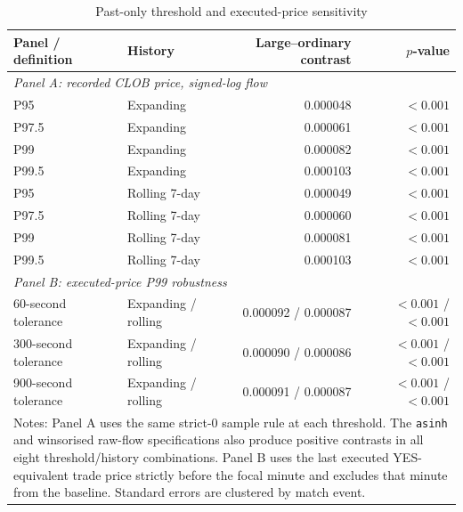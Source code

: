 \begin{table}[htbp]
\centering
\caption{Past-only threshold and executed-price sensitivity}
\label{tab:v6-sensitivity}
\small
\begin{tabular}{llrr}
\toprule
Panel / definition & History & Large--ordinary contrast & $p$-value \\
\midrule
\multicolumn{4}{l}{\textit{Panel A: recorded CLOB price, signed-log flow}} \\
P95   & Expanding & 0.000048 & $<0.001$ \\
P97.5 & Expanding & 0.000061 & $<0.001$ \\
P99   & Expanding & 0.000082 & $<0.001$ \\
P99.5 & Expanding & 0.000103 & $<0.001$ \\
P95   & Rolling 7-day & 0.000049 & $<0.001$ \\
P97.5 & Rolling 7-day & 0.000060 & $<0.001$ \\
P99   & Rolling 7-day & 0.000081 & $<0.001$ \\
P99.5 & Rolling 7-day & 0.000103 & $<0.001$ \\
\midrule
\multicolumn{4}{l}{\textit{Panel B: executed-price P99 robustness}} \\
60-second tolerance  & Expanding / rolling & 0.000092 / 0.000087 & $<0.001$ / $<0.001$ \\
300-second tolerance & Expanding / rolling & 0.000090 / 0.000086 & $<0.001$ / $<0.001$ \\
900-second tolerance & Expanding / rolling & 0.000091 / 0.000087 & $<0.001$ / $<0.001$ \\
\bottomrule
\multicolumn{4}{p{0.92\textwidth}}{\footnotesize Notes: Panel A uses the same strict-0 sample rule at each threshold. The \texttt{asinh} and winsorised raw-flow specifications also produce positive contrasts in all eight threshold/history combinations. Panel B uses the last executed YES-equivalent trade price strictly before the focal minute and excludes that minute from the baseline. Standard errors are clustered by match event.}
\end{tabular}
\end{table}
